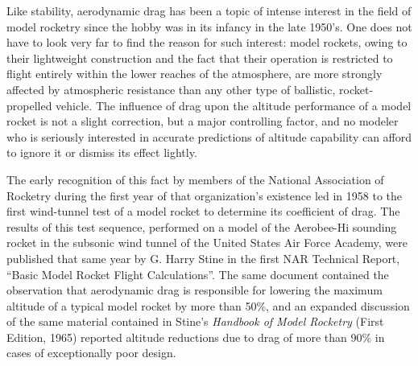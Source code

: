 \label{ch3:sec:intro}

Like stability, aerodynamic drag has been a topic of intense interest in the
field of model rocketry since the hobby was in its infancy in the late 1950's.
One does not have to look very far to find the reason for such interest: model
rockets, owing to their lightweight construction and the fact that their
operation is restricted to flight entirely within the lower reaches of the
atmosphere, are more strongly affected by atmospheric resistance than any
other type of ballistic, rocket-propelled vehicle. The influence of drag upon
the altitude performance of a model rocket is not a slight correction, but a
major controlling factor, and no modeler who is seriously interested in
accurate predictions of altitude capability can afford to ignore it or dismiss
its effect lightly.

The early recognition of this fact by members of the National Association of
Rocketry during the first year of that organization's existence led in 1958 to
the first wind-tunnel test of a model rocket to determine its coefficient of
drag. The results of this test sequence, performed on a model of the
Aerobee-Hi sounding rocket in the subsonic wind tunnel of the United States
Air Force Academy, were published that same year by G. Harry Stine in the
first NAR Technical Report, ``Basic Model Rocket Flight Calculations''. The
same document contained the observation that aerodynamic drag is responsible
for lowering the maximum altitude of a typical model rocket by more than 50\%,
and an expanded discussion of the same material contained in Stine's
\emph{Handbook of Model Rocketry} (First Edition, 1965) reported altitude
reductions due to drag of more than 90\% in cases of exceptionally poor
design.

